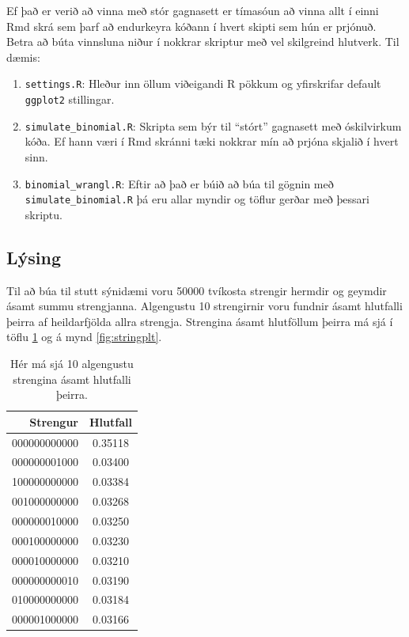 \documentclass[10pt,]{article}
\begin{document}
Ef það er verið að vinna með stór gagnasett er tímasóun að vinna allt í einni Rmd skrá sem þarf að endurkeyra kóðann í hvert skipti sem hún er prjónuð. Betra að búta vinnsluna niður í nokkrar skriptur með vel skilgreind hlutverk. Til dæmis:

\begin{enumerate}
\def\labelenumi{\arabic{enumi}.}
\item
  \texttt{settings.R}: Hleður inn öllum viðeigandi R pökkum og yfirskrifar default \texttt{ggplot2} stillingar.
\item
  \texttt{simulate\_binomial.R}: Skripta sem býr til ``stórt'' gagnasett með óskilvirkum kóða. Ef hann væri í Rmd skránni tæki nokkrar mín að prjóna skjalið í hvert sinn.
\item
  \texttt{binomial\_wrangl.R}: Eftir að það er búið að búa til gögnin með \texttt{simulate\_binomial.R} þá eru allar myndir og töflur gerðar með þessari skriptu.
\end{enumerate}

\hypertarget{luxfdsing}{%
\subsection{Lýsing}\label{luxfdsing}}

Til að búa til stutt sýnidæmi voru 50000 tvíkosta strengir hermdir og geymdir ásamt summu strengjanna. Algengustu 10 strengirnir voru fundnir ásamt hlutfalli þeirra af heildarfjölda allra strengja. Strengina ásamt hlutföllum þeirra má sjá í töflu \ref{tab:strings} og á mynd \ref{fig:stringplt}.

\begin{table}[!h]

\caption{\label{tab:unnamed-chunk-3}\label{tab:strings} Hér má sjá 10 algengustu strengina ásamt hlutfalli þeirra.}
\centering
\begin{tabular}[t]{rc}
\toprule
\textbf{Strengur} & \textbf{Hlutfall}\\
\midrule
000000000000 & 0.35118\\
000000001000 & 0.03400\\
100000000000 & 0.03384\\
001000000000 & 0.03268\\
000000010000 & 0.03250\\
000100000000 & 0.03230\\
000010000000 & 0.03210\\
000000000010 & 0.03190\\
010000000000 & 0.03184\\
000001000000 & 0.03166\\
\bottomrule
\end{tabular}
\end{table}
\end{document}

